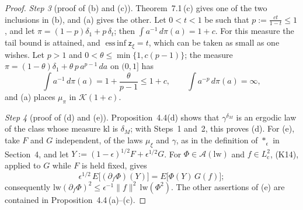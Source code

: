 \documentclass[11pt,letterpaper,reqno]{amsart}
\theoremstyle{definition}
\begin{document}
\begin{proof}
\emph{Step 3} (proof of (b) and (c)).
Theorem~7.1\,(c) gives one of the two inclusions in (b), and (a) gives the other.
Let $0<t<1$ be such that $p:=\frac{ct}{1-t}\le1$,
and let $\pi=(1-p)\delta_1+p\,\delta_t$;
then $\int a^{-1}\,d\pi(a)=1+c$.
For this measure the tail bound is attained,
and $\operatorname{ess\,inf}\mathsf z_\xi=t$, which can be taken as small as one wishes.
Let $p>1$ and $0<\theta\le\min\{1,c(p-1)\}$;
the measure $\pi=(1-\theta)\delta_1+\theta\,p\,a^{p-1}\,da$ on $(0,1]$ has
\begin{equation*}
\int a^{-1}\,d\pi(a)=1+\frac{\theta}{p-1}\le1+c,\qquad\int a^{-p}\,d\pi(a)=\infty,
\end{equation*}
and (a) places $\mu_\pi$ in $\mathcal K(1+c)$.

\emph{Step 4} (proof of (d) and (e)).
Proposition~4.4(d) shows that $\gamma^{\delta_M}$ is an ergodic law of the class whose measure $\mathrm{kl}$ is $\delta_M$;
with Steps~1 and~2, this proves (d).
For (e), take $F$ and $G$ independent, of the laws $\mu_\xi$ and $\gamma$, as in the definition of $\ast_\epsilon$ in Section~4,
and let $Y:=(1-\epsilon)^{1/2}F+\epsilon^{1/2}G$.
For $\Phi\in\mathcal A(\mathrm{lw})$ and $f\in L^2_{\mathrm c}$, (K14), applied to $G$ while $F$ is held fixed, gives
\begin{equation*}
\epsilon^{1/2}\,E\bigl[(\partial_f\Phi)(Y)\bigr]=E\bigl[\Phi(Y)\,G(f)\bigr];
\end{equation*}
consequently $\mathrm{lw}(\partial_f\Phi)^2\le\epsilon^{-1}\|f\|^2\,\allowbreak \mathrm{lw}(\Phi^2)$.
The other assertions of (e) are contained in Proposition~4.4\,(a)--(c).
\end{proof}
\end{document}

